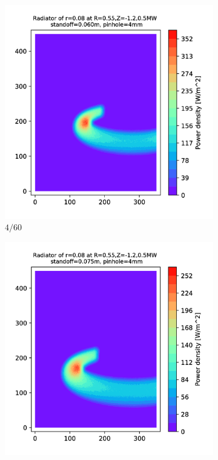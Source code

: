 \begin{figure}
\begin{subfigure}{0.3\textwidth}
         \includegraphics[trim={70 0 125 0},clip,width=\textwidth]{Chapters/appendix1/figs/4_60.png}
         \caption{$4/60$}
         \label{fig:4_60}
     \end{subfigure}
     \hfill
     \begin{subfigure}{0.325\textwidth}
         \centering
         \includegraphics[trim={70 0 0 0},clip,width=\textwidth]{Chapters/appendix1/figs/4_75.png}

\end{subfigure}
\end{figure}
